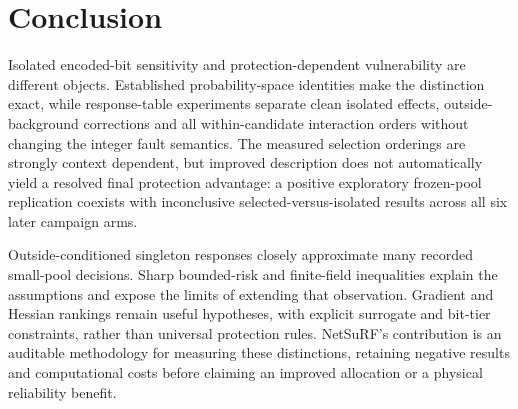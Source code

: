 \section{Conclusion}\label{sec:conclusion}
Isolated encoded-bit sensitivity and protection-dependent vulnerability are different objects. Established probability-space identities make the distinction exact, while response-table experiments separate clean isolated effects, outside-background corrections and all within-candidate interaction orders without changing the integer fault semantics. The measured selection orderings are strongly context dependent, but improved description does not automatically yield a resolved final protection advantage: a positive exploratory frozen-pool replication coexists with inconclusive selected-versus-isolated results across all six later campaign arms.

Outside-conditioned singleton responses closely approximate many recorded small-pool decisions. Sharp bounded-risk and finite-field inequalities explain the assumptions and expose the limits of extending that observation. Gradient and Hessian rankings remain useful hypotheses, with explicit surrogate and bit-tier constraints, rather than universal protection rules. NetSuRF's contribution is an auditable methodology for measuring these distinctions, retaining negative results and computational costs before claiming an improved allocation or a physical reliability benefit.
